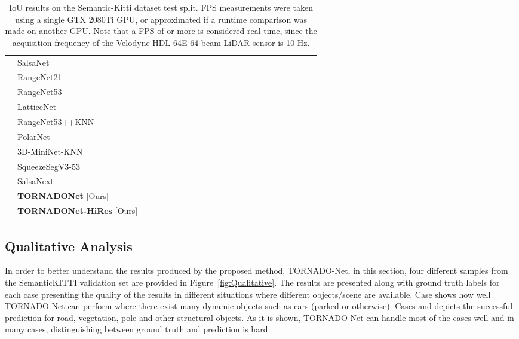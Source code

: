 \documentclass{article}
\begin{document}
\begin{table*}[h]
{\begin{tabular}{c|l|ccccccccccccccccccccc}
& SalsaNet \cite{aksoy2019salsanet} &  &  &  &  &  &  &  &  &  &  &  &  &  &  &  &  &  &  &  &  &  \\
& RangeNet21 \cite{milioto2019rangenet++} &   &  &  &  &  &  &  &  &  &  &  &  &  &  &  &  &  &  &  &   &  \\
& RangeNet53 \cite{milioto2019rangenet++} &   &  &  &  &  &  &  &  &  &  &  &  &  &  &  &  &  &  &  & 
 &  \\
& LatticeNet  \cite{rosu2019latticenet} &  &  &  &  &  &  &  &  &  &  &  &  &  &  &  &  &  &  &  &   & \\
& RangeNet53++KNN \cite{milioto2019rangenet++} &  &  &  &  &  &  &  &  &  &  &  &  &  &  &  &  &  &  &  &  &   \\
& PolarNet \cite{zhang2020polarnet} &  &  &  &  &  &  &  &  &  &  &  &  &  &  &  &  &  &  &  &  &  \\
& 3D-MiniNet-KNN \cite{alonso20203d} &  &  &  &  &  &  &  &  &  &  &  &  &  &  &  &  &  &  &  &   & \\
& SqueezeSegV3-53 \cite{xu2020squeezesegv3} &  &  &  &  &  &  &  &  &  &  &  &  &  &  &  &  &  &  &  &  &   \\
& SalsaNext \cite{cortinhal2020salsanext} &  &  &  &  &  &  &  &  &  &  &  &  &  &  &  &  &  &  &  &   &   \\

\cline{2-23} 
& \textbf{TORNADONet} [Ours] 
& &  &  &  &  &  &  &  &  &  &  &  &  &  &  &  &  &  &  &  &  \\

& \textbf{TORNADONet-HiRes} [Ours] 
& &  &  &  &  &  &  &  &  &  &  &  &  &  &  &  &  &  &  &  &   \\

\hline
\end{tabular}
}
\caption[CPNET]{IoU results on the Semantic-Kitti dataset test split. FPS measurements were taken using a single GTX 2080Ti GPU, or approximated if a runtime comparison was made on another GPU. Note that a FPS of  or more is considered real-time, since the acquisition frequency of the Velodyne HDL-64E 64 beam LiDAR sensor is 10 Hz.}
\label{bigtable}
\end{table*}

\subsection{Qualitative Analysis}
In order to better understand the results produced by the proposed method, TORNADO-Net, in this section, four different samples from the SemanticKITTI \cite{DBLP:conf/iccv/BehleyGMQBSG19} validation set are provided in Figure~\ref{fig:Qualitative}. The results are presented along with ground truth labels for each case presenting the quality of the results in different situations where different objects/scene are available. Case  shows how well TORNADO-Net can perform where there exist many dynamic objects such as cars (parked or otherwise). Cases  and  depicts the successful prediction for road, vegetation, pole and other structural objects. As it is shown, TORNADO-Net can handle most of the cases well and in many cases, distinguishing between ground truth and prediction is hard.
\end{document}

